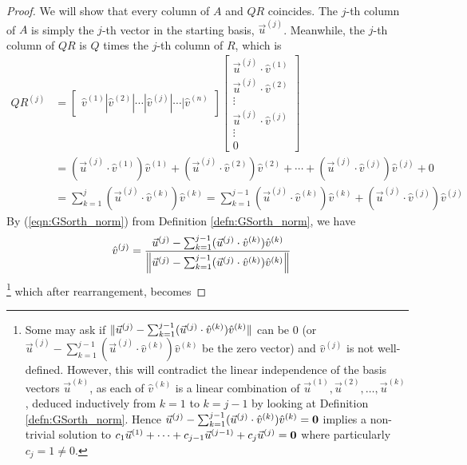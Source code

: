 \begin{proof}
We will show that every column of $A$ and $QR$ coincides. The $j$-th column of $A$ is simply the $j$-th vector in the starting basis, $\vec{u}^{(j)}$. Meanwhile, the $j$-th column of $QR$ is $Q$ times the $j$-th column of $R$, which is
\begin{align*}
QR^{(j)} &=
\begin{bmatrix}
\hat{v}^{(1)}|\hat{v}^{(2)}|\cdots|\hat{v}^{(j)}|\cdots|\hat{v}^{(n)}   
\end{bmatrix}
\begin{bmatrix}
\vec{u}^{(j)} \cdot \hat{v}^{(1)} \\   
\vec{u}^{(j)} \cdot \hat{v}^{(2)} \\   
\vdots \\
\vec{u}^{(j)} \cdot \hat{v}^{(j)} \\
\vdots \\
0
\end{bmatrix} \\
&= (\vec{u}^{(j)} \cdot \hat{v}^{(1)}) \hat{v}^{(1)} + (\vec{u}^{(j)} \cdot \hat{v}^{(2)}) \hat{v}^{(2)} + \cdots + (\vec{u}^{(j)} \cdot \hat{v}^{(j)}) \hat{v}^{(j)} + 0 \\
&= \sum_{k=1}^{j}(\vec{u}^{(j)} \cdot \hat{v}^{(k)})\hat{v}^{(k)} = \sum_{k=1}^{j-1}(\vec{u}^{(j)} \cdot \hat{v}^{(k)})\hat{v}^{(k)} + (\vec{u}^{(j)} \cdot \hat{v}^{(j)})\hat{v}^{(j)}
\end{align*}
By (\ref{eqn:GSorth_norm}) from Definition \ref{defn:GSorth_norm}, we have
\begin{align*}
\hat{v}^{(j)} &= \frac{\vec{u}^{(j)} - \sum_{k=1}^{j-1}(\vec{u}^{(j)} \cdot \hat{v}^{(k)})\hat{v}^{(k)}}{\norm{\vec{u}^{(j)} - \sum_{k=1}^{j-1}(\vec{u}^{(j)} \cdot \hat{v}^{(k)})\hat{v}^{(k)}}}
\end{align*}
\footnote{\label{foot:GSnonzero} Some may ask if $\norm{\smash{\vec{u}^{(j)} - \sum_{k=1}^{j-1}(\vec{u}^{(j)} \cdot \hat{v}^{(k)})\hat{v}^{(k)}}}$ can be $0$ (or $\vec{u}^{(j)} - \sum_{k=1}^{j-1}(\vec{u}^{(j)} \cdot \hat{v}^{(k)})\hat{v}^{(k)}$ be the zero vector) and $\hat{v}^{(j)}$ is not well-defined. However, this will contradict the linear independence of the basis vectors $\vec{u}^{(k)}$, as each of $\hat{v}^{(k)}$ is a linear combination of $\vec{u}^{(1)}, \vec{u}^{(2)}, \ldots, \vec{u}^{(k)}$, deduced inductively from $k = 1$ to $k = j-1$ by looking at Definition \ref{defn:GSorth_norm}. Hence $\vec{u}^{(j)} - \smash{\sum_{k=1}^{j-1}(\vec{u}^{(j)} \cdot \hat{v}^{(k)})\hat{v}^{(k)}} = \textbf{0}$ implies a non-trivial solution to $\smash{c_1 \vec{u}^{(1)}} + \cdots + \smash{c_{j-1}\vec{u}^{(j-1)}} + \smash{c_j\vec{u}^{(j)}} = \textbf{0}$ where particularly $c_j = 1 \neq 0$.} which after rearrangement, becomes

\end{proof}
